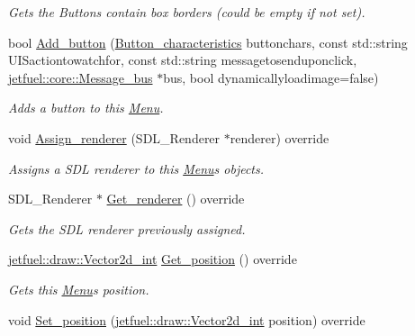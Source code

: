 \begin{DoxyCompactItemize}
\begin{DoxyCompactList}\small\item\em Gets the Buttons\textquotesingle{} contain box borders (could be empty if not set). \end{DoxyCompactList}\item 
bool \hyperlink{classjetfuel_1_1gui_1_1Menu_a6f0162b01dbf0bd6bf65cfb3712499fc}{Add\+\_\+button} (\hyperlink{structjetfuel_1_1gui_1_1Menu_1_1Button__characteristics}{Button\+\_\+characteristics} buttonchars, const std\+::string U\+I\+Sactiontowatchfor, const std\+::string messagetosenduponclick, \hyperlink{classjetfuel_1_1core_1_1Message__bus}{jetfuel\+::core\+::\+Message\+\_\+bus} $\ast$bus, bool dynamicallyloadimage=false)
\begin{DoxyCompactList}\small\item\em Adds a button to this \hyperlink{classjetfuel_1_1gui_1_1Menu}{Menu}. \end{DoxyCompactList}\item 
void \hyperlink{classjetfuel_1_1gui_1_1Menu_acf4a69ccd0ee1490d02fa005c8eba1b4}{Assign\+\_\+renderer} (S\+D\+L\+\_\+\+Renderer $\ast$renderer) override
\begin{DoxyCompactList}\small\item\em Assigns a S\+DL renderer to this \hyperlink{classjetfuel_1_1gui_1_1Menu}{Menu}\textquotesingle{}s objects. \end{DoxyCompactList}\item 
S\+D\+L\+\_\+\+Renderer $\ast$ \hyperlink{classjetfuel_1_1gui_1_1Menu_a411940386454af4e44dc8c0c84c00215}{Get\+\_\+renderer} () override
\begin{DoxyCompactList}\small\item\em Gets the S\+DL renderer previously assigned. \end{DoxyCompactList}\item 
\hyperlink{classjetfuel_1_1draw_1_1Vector2d}{jetfuel\+::draw\+::\+Vector2d\+\_\+int} \hyperlink{classjetfuel_1_1gui_1_1Menu_ac1aebb753feba17be808f2068ff17e74}{Get\+\_\+position} () override
\begin{DoxyCompactList}\small\item\em Gets this \hyperlink{classjetfuel_1_1gui_1_1Menu}{Menu}\textquotesingle{}s position. \end{DoxyCompactList}\item 
void \hyperlink{classjetfuel_1_1gui_1_1Menu_ab575d5e4ad9d86d6781012e7d1bebc9a}{Set\+\_\+position} (\hyperlink{classjetfuel_1_1draw_1_1Vector2d}{jetfuel\+::draw\+::\+Vector2d\+\_\+int} position) override

\end{DoxyCompactItemize}
